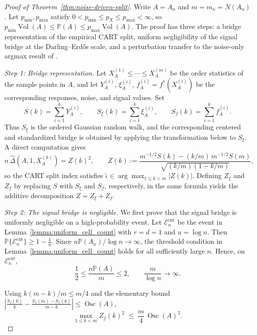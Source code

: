 \documentclass[11pt]{article}
\theoremstyle{plain}
\theoremstyle{definition}
\theoremstyle{remark}
\theoremstyle{plain}
\renewcommand{\P}{\mathbb{P}}
\DeclareMathOperator{\Vol}{Vol}
\newcommand{\1}{\mathbbm{1}}
\newcommand{\Osc}{\operatorname{Osc}}
\begin{document}
\begin{proof}[Proof of Theorem~\ref{thm:noise-driven-split}]
Write $A=A_n$ and $m=m_n=N(A_n)$. Let $p_{\min},p_{\max}$ satisfy
$0<p_{\min}\le p_X\le p_{\max}<\infty$, so
$p_{\min}\Vol(A)\le\P(A)\le p_{\max}\Vol(A)$.
The proof has three steps: a bridge representation of the empirical
CART split, uniform negligibility of the signal bridge at the
Darling--Erd\H{o}s scale, and a perturbation transfer to the noise-only
argmax result of \citet{cattaneo2025honest}.

\medskip\noindent\textit{Step 1: Bridge representation.}
Let $X_A^{(1)}\le\cdots\le X_A^{(m)}$ be the order statistics of the
sample points in $A$, and let $Y_A^{(i)}$, $\xi_A^{(i)}$,
$f_A^{(i)}=f^*(X_A^{(i)})$ be the corresponding responses, noise, and
signal values. Set
\[
    S(k)=\sum_{i=1}^k Y_A^{(i)},\qquad
    S_\xi(k)=\sum_{i=1}^k \xi_A^{(i)},\qquad
    S_f(k)=\sum_{i=1}^k f_A^{(i)}.
\]
Thus $S_\xi$ is the ordered Gaussian random walk, and the corresponding
centered and standardized bridge is obtained by applying the transformation
below to $S_\xi$. A direct computation gives
\[
    n\,\widehat\Delta(A,1,X_A^{(k)})
    =
    Z(k)^2,
    \qquad
    Z(k):=
    \frac{m^{-1/2}S(k)-(k/m)\,m^{-1/2}S(m)}{\sqrt{(k/m)(1-k/m)}},
\]
so the CART split index satisfies
$\widehat\iota\in\arg\max_{1\le k<m}|Z(k)|$.
Defining $Z_\xi$ and $Z_f$ by replacing $S$ with $S_\xi$ and $S_f$,
respectively, in the same formula yields the additive decomposition
$Z=Z_\xi+Z_f$.

\medskip\noindent\textit{Step 2: The signal bridge is negligible.}
We first prove that the signal bridge is uniformly negligible on a high-probability event. Let $\mathcal E_n^{\mathrm{cnt}}$ be the event in Lemma~\ref{lemma:uniform_cell_count} with $r=d=1$ and $u=\log n$. Then $\P\{\mathcal E_n^{\mathrm{cnt}}\}\ge 1-\frac{1}{n}.$
Since $n\P(A_n)/\log n\to\infty$, the threshold condition in Lemma~\ref{lemma:uniform_cell_count} holds for all sufficiently large $n$. Hence, on $\mathcal E_n^{\mathrm{cnt}}$,
\[
    \frac{1}{2}
    \le\frac{n\P(A)}{m}\le2,
    \qquad
    \frac{m}{\log n}\to\infty .
\]

Using $k(m-k)/m\le m/4$ and the elementary bound
$|\frac{S_f(k)}{k}-\frac{S_f(m)-S_f(k)}{m-k}|\le\Osc(A)$,
\begin{equation}\label{eq:Zf-osc-bound}
    \max_{1\le k<m} Z_f(k)^2
    \;\le\;
    \frac{m}{4}\,\Osc(A)^2.
\end{equation}


\end{proof}
\end{document}
